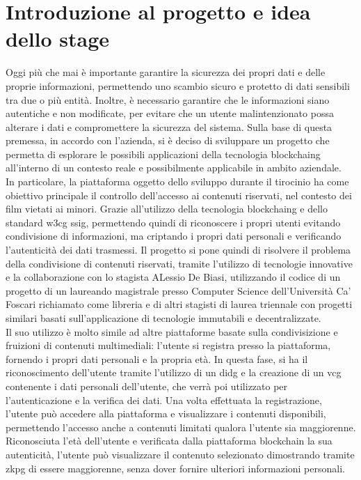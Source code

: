 \newpage

\section{Introduzione al progetto e idea dello stage}

Oggi più che mai è importante garantire la sicurezza dei propri dati e delle proprie informazioni, permettendo uno scambio sicuro
e protetto di dati sensibili tra due o più entità. Inoltre, è necessario garantire che le informazioni siano autentiche e non modificate,
per evitare che un utente malintenzionato possa alterare i dati e compromettere la sicurezza del sistema.
Sulla base di questa premessa, in accordo con l'azienda, si è deciso di sviluppare un progetto che permetta di esplorare 
le possibili applicazioni della tecnologia \gls{blockchaing} all'interno di un contesto reale e possibilmente applicabile in ambito aziendale. \\

In particolare, la piattaforma oggetto dello sviluppo durante il tirocinio ha come obiettivo principale il controllo dell'accesso ai contenuti
riservati, nel contesto dei film vietati ai minori. Grazie all'utilizzo della tecnologia \gls{blockchaing} e dello standard \gls{w3cg} \gls{ssig},
permettendo quindi di riconoscere i propri utenti evitando condivisione di informazioni, ma criptando i propri dati personali e verificando l'autenticità
dei dati trasmessi. Il progetto si pone quindi di risolvere il problema della condivisione di contenuti riservati, tramite l'utilizzo di tecnologie innovative
e la collaborazione con lo stagista ALessio De Biasi, utilizzando il codice di un progetto di un laureando magistrale presso Computer Science
dell'Università Ca' Foscari richiamato come libreria e di altri stagisti di laurea triennale con progetti similari basati sull'applicazione di tecnologie immutabili e decentralizzate. \\

Il suo utilizzo è molto simile ad altre piattaforme basate sulla condivisizione e fruizioni di contenuti multimediali:
l'utente si registra presso la piattaforma, fornendo i propri dati personali e la propria età. In questa fase, si ha il riconoscimento dell'utente
tramite l'utilizzo di un \gls{didg} e la creazione di un \gls{vcg} contenente i dati personali dell'utente, che verrà poi utilizzato per l'autenticazione
e la verifica dei dati. Una volta effettuata la registrazione, l'utente può accedere alla piattaforma e visualizzare i contenuti disponibili, permettendo l'accesso
anche a contenuti limitati qualora l'utente sia maggiorenne. Riconosciuta l'età dell'utente e verificata dalla piattaforma blockchain la sua autenticità,
l'utente può visualizzare il contenuto selezionato dimostrando tramite \gls{zkpg} di essere maggiorenne, senza dover fornire ulteriori informazioni personali. \\

